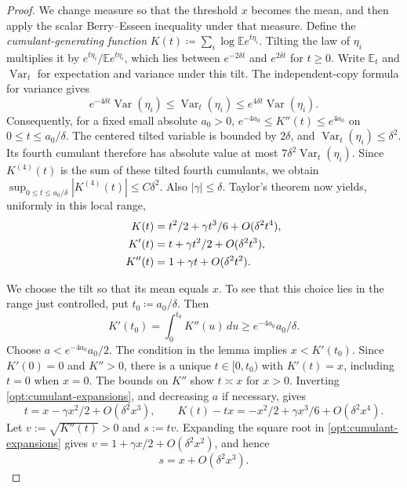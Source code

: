 \documentclass[11pt,letterpaper]{article}
\theoremstyle{remark}
\newcommand{\E}{\mathbb E}
\newcommand{\Var}{\operatorname{Var}}
\begin{document}
\begin{proof}
We change measure so that the threshold \(x\) becomes the mean, and
then apply the scalar Berry--Esseen inequality under that measure.
Define the \emph{cumulant-generating function}
\(K(t)\coloneqq\sum_i\log\E e^{t\eta_i}\). Tilting the law of
\(\eta_i\) multiplies it by \(e^{t\eta_i}/\E e^{t\eta_i}\), which
lies between \(e^{-2\delta t}\) and \(e^{2\delta t}\) for \(t\ge0\).
Write \(\E_t\) and \(\Var_t\) for expectation and variance
under this tilt. The independent-copy formula for variance gives
\[
 e^{-4\delta t}\Var(\eta_i)
 \le\Var_t(\eta_i)\le e^{4\delta t}\Var(\eta_i).
\]
Consequently, for a fixed small absolute \(a_0>0\),
\(e^{-4a_0}\le K''(t)\le e^{4a_0}\) on
\(0\le t\le a_0/\delta\). The centered tilted variable is bounded by
\(2\delta\), and \(\Var_t(\eta_i)\le\delta^2\). Its fourth cumulant
therefore has absolute value at most
\(7\delta^2\Var_t(\eta_i)\). Since \(K^{(4)}(t)\) is the sum of
these tilted fourth cumulants, we obtain
\(\sup_{0\le t\le a_0/\delta}|K^{(4)}(t)|\le C\delta^2\).
Also \(|\gamma|\le\delta\). Taylor's theorem now yields, uniformly in
this local range,
\begin{align}
 K(t)&=t^2/2+\gamma t^3/6+O(\delta^2t^4),\notag\\
 K'(t)&=t+\gamma t^2/2+O(\delta^2t^3),\notag\\
 K''(t)&=1+\gamma t+O(\delta^2t^2).
 \label{opt:cumulant-expansions}
\end{align}

We choose the tilt so that its mean equals \(x\). To see that this
choice lies in the range just controlled, put \(t_0\coloneqq a_0/\delta\).
Then
\[
 K'(t_0)=\int_0^{t_0}K''(u)\,du
 \ge e^{-4a_0}a_0/\delta.
\]
Choose \(a<e^{-4a_0}a_0/2\). The condition in the lemma implies
\(x<K'(t_0)\). Since \(K'(0)=0\) and \(K''>0\), there is a unique
\(t\in[0,t_0)\) with \(K'(t)=x\), including \(t=0\) when \(x=0\).
The bounds on \(K''\) show \(t\asymp x\) for \(x>0\).
Inverting \eqref{opt:cumulant-expansions}, and decreasing \(a\) if
necessary, gives
\begin{equation}
 t=x-\gamma x^2/2+O(\delta^2x^3),\qquad
 K(t)-tx=-x^2/2+\gamma x^3/6+O(\delta^2x^4).
 \label{opt:tilt-root}
\end{equation}
Let \(v:=\sqrt{K''(t)}>0\) and \(s:=tv\). Expanding the square root in
\eqref{opt:cumulant-expansions} gives
\(v=1+\gamma x/2+O(\delta^2x^2)\), and hence
\begin{equation}
 s=x+O(\delta^2x^3).
 \label{opt:tilted-scale}
\end{equation}


\end{proof}
\end{document}
